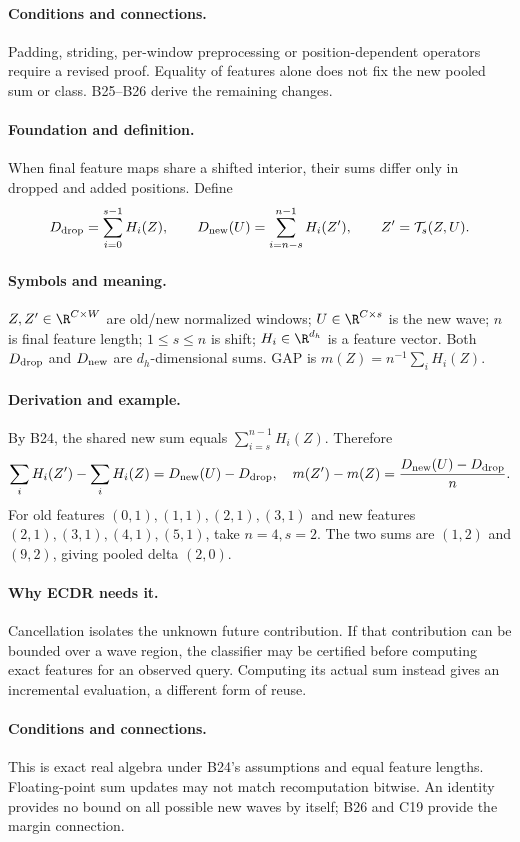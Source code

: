\paragraph{Conditions and connections.}
Padding, striding, per-window preprocessing or position-dependent operators
require a revised proof. Equality of features alone does not fix the
new pooled sum or class. B25--B26 derive the remaining changes.

\paragraph{Foundation and definition.}
When final feature maps share a shifted interior, their sums differ only
in dropped and added positions. Define
\[
 D_{\rm drop}=\sum_{i=0}^{s-1}H_i(Z),\qquad
 D_{\rm new}(U)=\sum_{i=n-s}^{n-1}H_i(Z'),
 \qquad Z'=\mathcal T_s(Z,U).
\]
\paragraph{Symbols and meaning.}
$Z,Z'\in\R^{C\times W}$ are old/new normalized windows; $U\in\R^{C\times s}$
is the new wave; $n$ is final feature length; $1\le s\le n$ is shift;
$H_i\in\R^{d_h}$ is a feature vector. Both $D_{\rm drop}$ and
$D_{\rm new}$ are $d_h$-dimensional sums. GAP is
$m(Z)=n^{-1}\sum_iH_i(Z)$.
\paragraph{Derivation and example.}
By B24, the shared new sum equals $\sum_{i=s}^{n-1}H_i(Z)$. Therefore
\[
 \sum_iH_i(Z')-\sum_iH_i(Z)=D_{\rm new}(U)-D_{\rm drop},
 \quad m(Z')-m(Z)=\frac{D_{\rm new}(U)-D_{\rm drop}}n.
\]
For old features $(0,1),(1,1),(2,1),(3,1)$ and new features
$(2,1),(3,1),(4,1),(5,1)$, take $n=4,s=2$.
The two sums are $(1,2)$ and $(9,2)$, giving pooled delta $(2,0)$.
\paragraph{Why ECDR needs it.}
Cancellation isolates the unknown future contribution. If that contribution
can be bounded over a wave region, the classifier may be certified before
computing exact features for an observed query. Computing its actual sum
instead gives an incremental evaluation, a different form of reuse.
\paragraph{Conditions and connections.}
This is exact real algebra under B24's assumptions and equal feature
lengths. Floating-point sum updates may not match recomputation bitwise.
An identity provides no bound on all possible new waves by itself;
B26 and C19 provide the margin connection.

